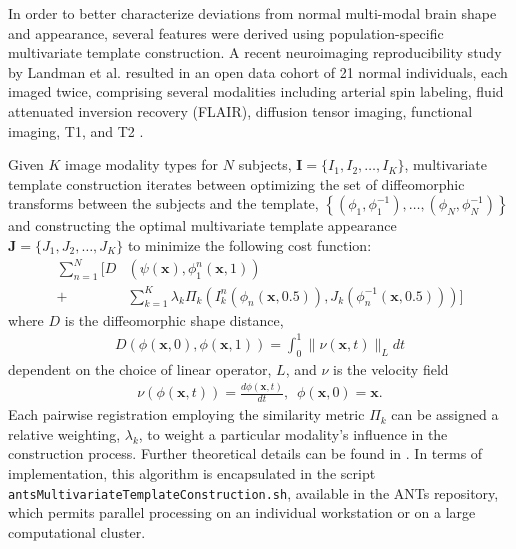 \documentclass[final,5p,times,twocolumn]{elsarticle}
\begin{document}
In order to better characterize deviations from normal
multi-modal brain shape and appearance, several features were derived 
using population-specific multivariate template 
construction. A recent neuroimaging reproducibility study
by Landman et al. resulted in an open data cohort of 21
normal individuals, each imaged twice, comprising several
modalities including arterial spin labeling, 
fluid attenuated inversion recovery (FLAIR),
diffusion tensor imaging, functional imaging, T1, and T2 
\cite{landman2011}.

Given $K$ image modality types for $N$ subjects,  
${\mathbf I} = \{I_1,I_2,\ldots, I_K\}$, multivariate 
template construction iterates between optimizing the set 
of diffeomorphic transforms between the subjects and the 
template, 
$\left\{\left(\phi_1,\phi_1^{-1}\right),\ldots,\left(\phi_N,\phi_N^{-1}\right)\right\}$ 
and constructing the 
optimal multivariate template appearance 
$\mathbf{J}=\{J_1,J_2,\ldots, J_K\}$ to minimize the
following cost function:
\begin{align}
  \sum_{n=1}^N 
        \Bigg[ D &\left( \psi(\mathbf{x}),\phi_1^n(\mathbf{x},1)\right) \\ \nonumber 
        +& \sum_{k=1}^K \lambda_k \Pi_k \left(I_k^n\left(\phi_n(\mathbf{x},0.5)\right),J_k\left(\phi^{-1}_n(\mathbf{x},0.5)\right)\right)\Bigg]
\end{align}
where $D$ is the diffeomorphic shape distance,
\begin{align}
D\left( \phi( \mathbf{x},0),\phi( \mathbf{x},1)\right) = \int_0^1 \| \nu(\mathbf{x},t)\|_L dt
\end{align}
dependent on the choice of linear operator, $L$, and $\nu$
is the velocity field
\begin{align}
\nu\left( \phi(\mathbf{x},t) \right) = \frac{d\phi(\mathbf{x},t)}{dt},\,\,\, \phi(\mathbf{x},0) = \mathbf{x}.
\end{align}
Each pairwise registration employing the similarity metric $\Pi_k$ can 
be assigned a relative weighting, $\lambda_k$, to weight a particular
modality's influence in the construction process.  Further theoretical
details can be found in \cite{avants2008,avants2010}.
In terms of implementation, this algorithm is 
encapsulated in the script \verb#antsMultivariateTemplateConstruction.sh#,
available in the ANTs repository, which permits parallel processing on
an individual workstation or on a large computational cluster.
\end{document}
